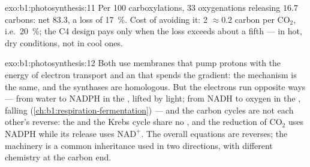 \begin{solution}{exo:b1:photosynthesis:11}
Per 100 carboxylations, 33 oxygenations releasing $16.7$ carbons: net
$83.3$, a loss of \qty{17}{\%}. Cost of avoiding it: 2  $\approx
0.2$ carbon per $\mathrm{CO_2}$, i.e.\ \qty{20}{\%}; the C4 design pays
only when the loss exceeds about a fifth --- in hot, dry conditions,
not in cool ones.
\end{solution}

\begin{solution}{exo:b1:photosynthesis:12}
Both use membranes that pump protons with the energy of electron
transport and an  that spends the gradient: the mechanism
is the same, and the synthases are homologous. But the electrons run
opposite ways --- from water to NADPH in the , lifted by
light; from NADH to oxygen in the , falling
(\cref{ch:b1:respiration-fermentation}) --- and the carbon cycles are
not each other's reverse: the  and the Krebs cycle share
no , and the reduction of $\mathrm{CO_2}$ uses NADPH while its
release uses $\mathrm{NAD^+}$. The overall equations are reverses; the
machinery is a common inheritance used in two directions, with
different chemistry at the carbon end.
\end{solution}


